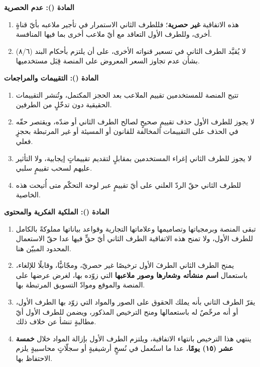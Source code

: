\documentclass[12pt,a4paper]{article}
\newcounter{bndc}
\newcommand{\bnd}[1]{%
  \vspace{10pt}\par\noindent
  {\color{teal}\bfseries\large المادة (\arabic{bndc}): #1}%
  \stepcounter{bndc}%
  \par\vspace{2pt}\noindent{\color{rule}\rule{\linewidth}{0.6pt}}\par\vspace{4pt}%
}
\newcommand{\mlh}[1]{{\bfseries #1}}
\newenvironment{bnditems}
  {\begin{enumerate}[label=\arabic{bndc}.\arabic*,leftmargin=1.6em,itemsep=3pt,topsep=3pt]}
  {\end{enumerate}}
\begin{document}
\bnd{عدم الحصرية}
\begin{bnditems}
  \item هذه الاتفاقية \mlh{غير حصرية}؛ فللطرف الثاني الاستمرار في تأجير ملاعبه بأيّ قناةٍ أخرى، وللطرف الأول التعاقد مع أيّ ملاعب أخرى بما فيها المنافسة.
  \item لا يُقيَّد الطرف الثاني في تسعير قنواته الأخرى، على أن يلتزم بأحكام البند (٨/٦) بشأن عدم تجاوز السعر المعروض على المنصة قِبَل مستخدميها.
\end{bnditems}

\bnd{التقييمات والمراجعات}
\begin{bnditems}
  \item تتيح المنصة للمستخدمين تقييم الملاعب بعد الحجز المكتمل، وتُنشر التقييمات الحقيقية دون تدخّلٍ من الطرفين.
  \item لا يجوز للطرف الأول حذف تقييمٍ صحيحٍ لصالح الطرف الثاني أو ضدّه، ويقتصر حقّه في الحذف على التقييمات المخالفة للقانون أو المسيئة أو غير المرتبطة بحجزٍ فعلي.
  \item لا يجوز للطرف الثاني إغراء المستخدمين بمقابلٍ لتقديم تقييماتٍ إيجابية، ولا التأثير عليهم لسحب تقييمٍ سلبي.
  \item للطرف الثاني حقّ الردّ العلني على أيّ تقييمٍ عبر لوحة التحكّم متى أُتيحت هذه الخاصية.
\end{bnditems}

\bnd{الملكية الفكرية والمحتوى}
\begin{bnditems}
  \item تبقى المنصة وبرمجياتها وتصاميمها وعلاماتها التجارية وقواعد بياناتها مملوكةً بالكامل للطرف الأول، ولا تمنح هذه الاتفاقية الطرف الثاني أيّ حقٍّ فيها عدا حقّ الاستعمال المحدود المبيّن هنا.
  \item يمنح الطرف الثاني الطرفَ الأول ترخيصًا غير حصريّ، ومجّانيًّا، وقابلًا للإلغاء، باستعمال \mlh{اسم منشأته وشعارها وصور ملاعبها} التي زوّده بها، لغرض عرضها على المنصة والموقع وموادّ التسويق المرتبطة بها.
  \item يقرّ الطرف الثاني بأنه يملك الحقوق على الصور والمواد التي زوّد بها الطرف الأول، أو أنه مرخّصٌ له باستعمالها ومنح الترخيص المذكور، ويضمن للطرف الأول أيّ مطالبةٍ تنشأ عن خلاف ذلك.
  \item ينتهي هذا الترخيص بانتهاء الاتفاقية، ويلتزم الطرف الأول بإزالة المواد خلال \mlh{خمسة عشر (١٥) يومًا}، عدا ما استُعمل في نُسخٍ أرشيفيةٍ أو سجلّاتٍ محاسبيةٍ يلزم الاحتفاظ بها.
\end{bnditems}
\end{document}
